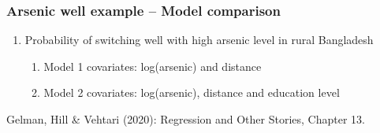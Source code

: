 \documentclass[10pt]{beamer}
\begin{document}















\begin{frame}{}

\frametitle{Arsenic well example -- Model comparison}

\begin{enumerate}
\item Probability of switching well with high arsenic level in rural Bangladesh
  \begin{enumerate}
    \item Model 1 covariates: log(arsenic) and distance
    \item Model 2 covariates: log(arsenic), distance and education level
  \end{enumerate}
\end{enumerate}

\vspace{10\baselineskip}
{\small Gelman, Hill \& Vehtari (2020): Regression and Other Stories, Chapter 13.}

\end{frame}
\end{document}

